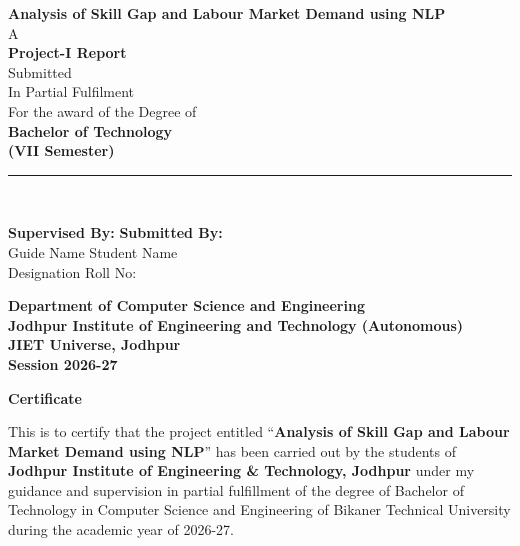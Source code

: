 \documentclass[12pt,a4paper]{report}
\begin{document}
\begin{titlepage}
    \begin{center}
        \vspace*{1cm}
        \Large{\textbf{Analysis of Skill Gap and Labour Market Demand using NLP}} \\
        \vspace{1cm}
        A \\
        \vspace{1cm}
        \Large{\textbf{Project-I Report}} \\
        \vspace{1cm}
        Submitted \\
        In Partial Fulfilment \\
        For the award of the Degree of \\
        \vspace{0.5cm}
        \Large{\textbf{Bachelor of Technology}} \\
        \Large{\textbf{(VII Semester)}} \\
        \vspace{1.5cm}
        \rule{4cm}{4cm} \\ %
        \vspace{1.5cm}
        
        \begin{flushleft}
        \textbf{Supervised By:} \hfill \textbf{Submitted By:} \\
        Guide Name \hfill Student Name \\
        Designation \hfill Roll No: \\
        \end{flushleft}
        
        \vspace{2cm}
        \textbf{Department of Computer Science and Engineering} \\
        \textbf{Jodhpur Institute of Engineering and Technology (Autonomous)} \\
        \textbf{JIET Universe, Jodhpur} \\
        \textbf{Session 2026-27}
    \end{center}
\end{titlepage}

\newpage
\thispagestyle{empty}
\begin{center}
    \vspace*{2cm}
    \Huge{\textbf{Certificate}}
\end{center}
\vspace{1cm}
\large
This is to certify that the project entitled ``\textbf{Analysis of Skill Gap and Labour Market Demand using NLP}'' has been carried out by the students of \textbf{Jodhpur Institute of Engineering \& Technology, Jodhpur} under my guidance and supervision in partial fulfillment of the degree of Bachelor of Technology in Computer Science and Engineering of Bikaner Technical University during the academic year of 2026-27.
\vspace{4cm}
\end{document}
